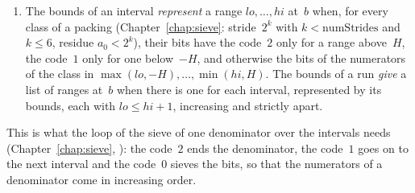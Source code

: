 \begin{definition}
\begin{enumerate}
      \verb|interval_bits_exact| computes from the scaled ends
      (); and otherwise the code~$0$ with the bits of the first
      and the last numerator of the class in $\max(\mathit{lo}, -H), \dots, \min(\mathit{hi}, H)$.
    \item The bounds of an interval \emph{represent} a range $\mathit{lo}, \dots, \mathit{hi}$
      at~$b$ when, for every class of a packing (Chapter~\ref{chap:sieve}: stride~$2^k$ with
      $k < \mathrm{numStrides}$ and $k \le 6$, residue $a_0 < 2^k$), their bits have the code~$2$
      only for a range above~$H$, the code~$1$ only for one below~$-H$, and otherwise the bits of
      the numerators of the class in $\max(\mathit{lo}, -H), \dots, \min(\mathit{hi}, H)$. The
      bounds of a run \emph{give} a list of ranges at~$b$ when there is one for each interval,
      represented by its bounds, each with $\mathit{lo} \le \mathit{hi} + 1$, increasing and
      strictly apart.
  \end{enumerate}
\end{definition}

This is what the loop of the sieve of one denominator over the intervals needs
(Chapter~\ref{chap:sieve}, ): the code~$2$ ends the denominator,
the code~$1$ goes on to the next interval and the code~$0$ sieves the bits, so that the numerators
of a denominator come in increasing order.

